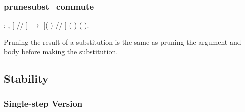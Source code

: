 \documentclass[12pt]{report}
\begin{document}
\subsubsection{prunesubst\_commute}

\begin{coqdoccode}
\coqdocemptyline
\coqdocindent{0.50em}
  : \coqdockw{\ensuremath{\forall}}     ,\coqdoceol
\coqdocindent{2.00em}
[ // ]    \ensuremath{\rightarrow}\coqdoceol
\coqdocindent{2.00em}
[(  ) // ] (  )  (  ).\coqdoceol
\coqdocemptyline
\end{coqdoccode}
Pruning the result of a substitution is the same as pruning the
argument and body before making the substitution. 

\subsection{Stability}



\subsubsection{Single-step Version}
\end{document}
